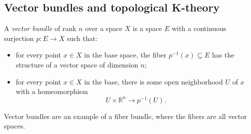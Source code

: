 \documentclass[10pt]{amsart}
\theoremstyle{definition}
\newcommand{\cdef}[1]{\textcolor{Bittersweet}{#1}}
\begin{document}
\subsection*{Vector bundles and topological K-theory}
A \cdef{\emph{vector bundle}} of rank $n$ over a space $X$ is a space $E$ with a continuous surjection $p:E \to X$ such that:
\begin{itemize}
    \item for every point $x \in X$ in the base space, the fiber $p^{-1}(x) \subseteq E$ has the structure of a vector space of dimension $n$;
    \item for every point $x \in X$ in the base, there is some open neighborhood $U$ of $x$ with a homeomorphism
    \[
    U \times \mathbb{R}^n \to p^{-1}(U).
    \] 
\end{itemize}
Vector bundles are an example of a fiber bundle, where the fibers are all vector spaces. 
\end{document}
